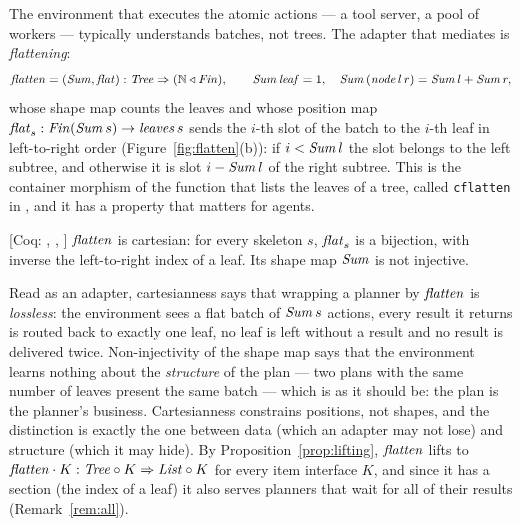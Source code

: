 \documentclass{fundam}
\begin{document}
The environment that executes the atomic actions --- a tool server, a pool of workers ---
typically understands batches, not trees.  The adapter that mediates is \emph{flattening}:
\[
  \mathit{flatten} = (\mathit{Sum}, \mathit{flat}) : \mathit{Tree} \Rightarrow (\mathbb{N} \triangleleft \mathit{Fin}),
  \qquad
  \mathit{Sum}\,\mathit{leaf} = 1,\quad \mathit{Sum}\,(\mathit{node}\,l\,r) = \mathit{Sum}\,l + \mathit{Sum}\,r,
\]
whose shape map counts the leaves and whose position map
$\mathit{flat}_s : \mathit{Fin}(\mathit{Sum}\,s) \to \mathit{leaves}\,s$ sends the $i$-th slot of the batch to the
$i$-th leaf in left-to-right order (Figure~\ref{fig:flatten}(b)): if $i < \mathit{Sum}\,l$ the
slot belongs to the left subtree, and otherwise it is slot $i - \mathit{Sum}\,l$ of the right
subtree.  This is the container morphism of the function that lists the leaves of a tree,
called \texttt{cflatten} in \cite[Listing~21]{Prince10}, and it has a property that
matters for agents.

\begin{proposition}\label{prop:flatten}
  \textsf{[Coq: , , ]}
  $\mathit{flatten}$ is cartesian: for every skeleton $s$, $\mathit{flat}_s$ is a bijection, with
  inverse the left-to-right index of a leaf.  Its shape map $\mathit{Sum}$ is not injective.
\end{proposition}

Read as an adapter, cartesianness says that wrapping a planner by $\mathit{flatten}$ is
\emph{lossless}: the environment sees a flat batch of $\mathit{Sum}\,s$ actions, every result it
returns is routed back to exactly one leaf, no leaf is left without a result and no result
is delivered twice.  Non-injectivity of the shape map says that the environment learns
nothing about the \emph{structure} of the plan --- two plans with the same number of leaves
present the same batch --- which is as it should be: the plan is the planner's business.
Cartesianness constrains positions, not shapes, and the distinction is exactly the one
between data (which an adapter may not lose) and structure (which it may hide).  By
Proposition~\ref{prop:lifting}, $\mathit{flatten}$ lifts to
$\mathit{flatten} \cdot K : \mathit{Tree} \circ K \Rightarrow \mathit{List} \circ K$ for every item interface
$K$, and since it has a section (the index of a leaf) it also serves planners that wait
for all of their results (Remark~\ref{rem:all}).
\end{document}
